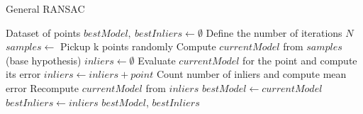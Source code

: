 \begin{algorithm}
\caption{General RANSAC}\label{alg:generic_ransac}
\begin{algorithmic}
\REQUIRE Dataset of points
\STATE $bestModel,\:bestInliers \gets \emptyset$
\STATE Define the number of iterations $N$
 \STATE $samples \gets$ Pickup k points randomly
 \STATE Compute $currentModel$ from $samples$ (base hypothesis)
 \STATE $inliers \gets \emptyset$
  \STATE Evaluate $currentModel$ for the point and compute its error
   \STATE $inliers \gets inliers + point$
  \ENDIF
 \ENDFOR
 \STATE Count number of inliers and compute mean error
  \STATE Recompute $currentModel$ from $inliers$
   \STATE $bestModel \gets currentModel$
   \STATE $bestInliers \gets inliers$
  \ENDIF
 \ENDIF
\ENDFOR
\RETURN $bestModel$, $bestInliers$
\end{algorithmic}
\end{algorithm}

